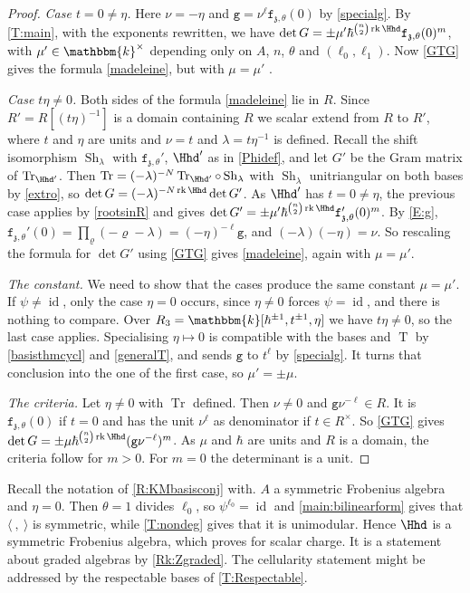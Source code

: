 \documentclass[a4paper,11pt]{amsart}
\let\<\langle
\let\>\rangle
\newcommand{\Tr}{\op{Tr}}
\newcommand{\T}{\op{T}}
\numberwithin{equation}{subsection}
\theoremstyle{definition}
\theoremstyle{theorem}
\theoremstyle{remark}
\newcommand\charge{{\mathfrak{z}}}
\newcommand\fct{\mathtt{f}_{\charge,\theta}}
\newcommand\gcy{\mathtt{g}}
\newcommand\Sh[1][\lambda]{\op{Sh}_{#1}}
\newcommand\op{\operatorname}
\newcommand\kk{\mathbbm{k}}
\begin{document}
\begin{proof}
   \noindent\emph{Case $t=0\neq\eta$.} Here $\nu=-\eta$ and $\gcy=\nu^{\ell}\fct(0)$
  by \autoref{specialg}. By \autoref{T:main}, with the exponents rewritten, we have $\det G=\pm\mu'\hbar^{\binom{n}{2}\op{rk}\Hhd}\fct(0)^{m}$,
  with $\mu'\in\kk^{\times}$ depending only on $A$, $n$, $\theta$ and
  $(\ell_0,\ell_1)$. Now \autoref{GTG} gives the formula \autoref{madeleine}, but with $\mu=\mu'$ .

   \noindent\emph{Case $t\eta\neq0$.} Both sides of the formula  \autoref{madeleine}  lie in $R$.
   Since $R'=R[(t\eta)^{-1}]$ is a domain containing $R$ we scalar extend from $R$ to $R'$,  where $t$ and $\eta$ are units and
  $\nu=t$ and $\lambda=t\eta^{-1}$ is defined. Recall the shift isomorphism $\Sh$ with $\fct'$,
  ${\Hhd}'$ as in \autoref{Phidef}, and let  $G'$ be the Gram matrix of
  $\Tr_{{\Hhd}'}$. Then $\Tr=(-\lambda)^{-N}\Tr_{{\Hhd}'}\circ\Sh$  with $\Sh$
  unitriangular on both bases by \autoref{extro}, so $\det G=(-\lambda)^{-N\op{rk}\Hhd}\det G'$.
  As ${\Hhd}'$ has $t=0\neq\eta$, the previous case applies by \autoref{rootsinR} and gives
  $\det G'=\pm\mu'\hbar^{\binom{n}{2}\op{rk}\Hhd}\fct'(0)^{m}$. By
  \autoref{E:g}, $\fct'(0)=\prod_{\varrho}(-\varrho-\lambda)=(-\eta)^{-\ell}\gcy$,
  and $(-\lambda)(-\eta)=\nu$. So rescaling the formula for $\det G'$ using \autoref{GTG} gives \autoref{madeleine}, again with $\mu=\mu'$.

   \noindent\emph{The constant.} We need to show that the cases produce the same constant $\mu=\mu'$. If $\psi\neq\op{id}$, only the case $\eta=0$ occurs, since $\eta\neq0$ forces $\psi=\op{id}$, and there is nothing to compare.
   Over $R_3=\kk[\hbar^{\pm1},t^{\pm1},\eta]$ we
  have $t\eta\neq0$, so the last case applies. Specialising $\eta\mapsto0$ is
  compatible with the bases and $\T$ by \autoref{basisthmcycl} and
  \autoref{generalT}, and sends $\gcy$ to $t^{\ell}$ by
  \autoref{specialg}. It turns that conclusion into the one of the first case,
  so $\mu'=\pm\mu$.

   \noindent\emph{The criteria.} Let $\eta\neq0$ with $\Tr$ defined. Then
  $\nu\neq0$ and $\gcy\nu^{-\ell}\in R$. It is $\fct(0)$ if $t=0$ and has
  the unit $\nu^{\ell}$ as denominator if $t\in R^{\times}$. So
  \autoref{GTG} gives
  $\det G=\pm\mu\hbar^{\binom{n}{2}\op{rk}\Hhd}(\gcy\nu^{-\ell})^{m}$. As $\mu$
  and $\hbar$ are units and $R$ is a domain, the criteria follow for $m>0$. For
  $m=0$ the determinant is a unit.
\end{proof}

\begin{Remark}\label{R:KMsymmetricconj}
  Recall the notation of \autoref{R:KMbasisconj} with. $A$ a symmetric Frobenius algebra and
  $\eta=0$. Then $\theta=1$ divides $\ell_0$, so $\psi^{\ell_0}=\op{id}$ and
  \autoref{main:bilinearform} gives that $\<\ ,\ \>$ is symmetric, while
  \autoref{T:nondeg} gives that it is unimodular. Hence $\Hhd$ is a symmetric
  Frobenius algebra, which proves \cite[Conjecture~3.22]{KleshchevMuth} for
  scalar charge. It is a statement about graded algebras by
  \autoref{Rk:Zgraded}. The
  cellularity statement \cite[Conjecture~3.23]{KleshchevMuth} might be addressed by
  the respectable bases of \autoref{T:Respectable}.
\end{Remark}
\end{document}
